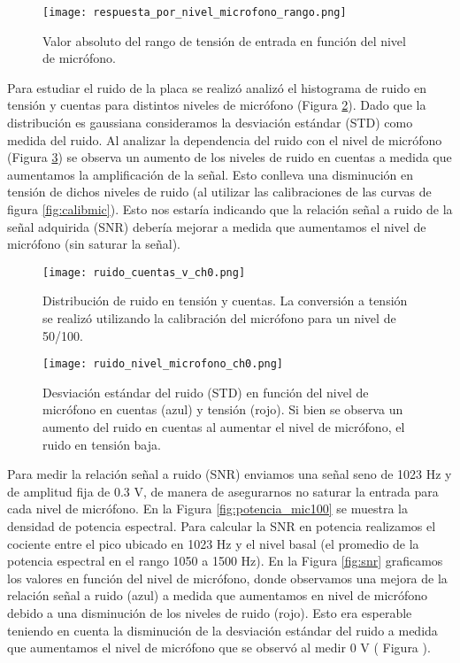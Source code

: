 \documentclass[a4paper, 11pt]{article}
\begin{document}
\begin{figure} [H]
\centering
\texttt{[image: respuesta\_por\_nivel\_microfono\_rango.png]}
\caption{Valor absoluto del rango de tensión de entrada en función del nivel de micrófono.\label{fig:calib_microfono2}}
\end{figure} 
Para estudiar el ruido de la placa se realizó analizó el histograma de ruido en tensión y cuentas para distintos niveles de micrófono (Figura \ref{fig:ruidocuentas}). Dado que la distribución es gaussiana consideramos la desviación estándar (STD) como medida del ruido. Al analizar la dependencia del ruido con el nivel de micrófono (Figura \ref{fig:ruidomic}) se observa un aumento de los niveles de ruido en cuentas a medida que aumentamos la amplificación de la señal. Esto conlleva una disminución en tensión de dichos niveles de ruido (al utilizar las calibraciones de las curvas de figura \ref{fig:calibmic}). Esto nos estaría indicando que la relación señal a ruido de la señal adquirida (SNR) debería mejorar a medida que aumentamos el nivel de micrófono (sin saturar la señal).

\begin{figure} [H]
\centering
\texttt{[image: ruido\_cuentas\_v\_ch0.png]}
\caption{Distribución de ruido en tensión y cuentas. La conversión a tensión se realizó utilizando la calibración del micrófono para un nivel de 50/100.\label{fig:ruidocuentas}}
\end{figure} 

\begin{figure} [H]
\centering
\texttt{[image: ruido\_nivel\_microfono\_ch0.png]}
\caption{Desviación estándar del ruido (STD) en función del nivel de micrófono en cuentas (azul) y tensión (rojo). Si bien se observa un aumento del ruido en cuentas al aumentar el nivel de micrófono, el ruido en tensión baja. \label{fig:ruidomic}}
\end{figure} 
Para medir la relación señal a ruido (SNR) enviamos una señal seno de 1023 Hz y de amplitud fija de 0.3 V, de manera de asegurarnos no saturar la entrada para cada nivel de micrófono. En la Figura \ref{fig:potencia_mic100} se muestra la densidad de potencia espectral. Para calcular la SNR en potencia realizamos el cociente entre el pico ubicado en 1023 Hz y el nivel basal (el promedio de la potencia espectral en el rango 1050 a 1500 Hz). En la Figura \ref{fig:snr} graficamos los valores en función del nivel de micrófono, donde observamos una mejora de la relación señal a ruido (azul) a medida que aumentamos en nivel de micrófono debido a una disminución de los niveles de ruido (rojo). Esto era esperable teniendo en cuenta la disminución de la desviación estándar del ruido a medida que aumentamos el nivel de micrófono que se observó al medir 0 V ( Figura \label{fig:ruidomic}).
\end{document}
